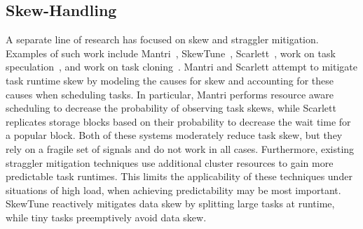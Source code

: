 \subsection{Skew-Handling}
A separate line of research has focused on skew and straggler mitigation.
Examples of such work include
Mantri~\cite{ananthanarayanan2010reining}, SkewTune~\cite{kwon2012skewtune},
Scarlett~\cite{ananthanarayanan2011scarlett}, work on task
speculation~\cite{zaharia2008improving}, and work on task cloning~\cite{ananthanarayanan2013effective,dean2013the}. Mantri and Scarlett attempt to
mitigate task runtime skew by modeling the causes for skew and accounting for
these causes when scheduling tasks. In particular, Mantri performs resource aware scheduling to decrease the
probability of observing task skews, while Scarlett replicates storage blocks
based on their probability to decrease the wait time for a popular block. Both of these systems moderately reduce task skew, but they rely on a fragile set of
signals and do not work in all cases.
Furthermore, existing straggler mitigation techniques use additional cluster resources to
gain more predictable task runtimes. This limits the applicability of these
techniques under situations of high load, when achieving predictability may be
most important.
SkewTune reactively mitigates data skew by splitting large tasks at runtime, while tiny tasks preemptively avoid data skew.


